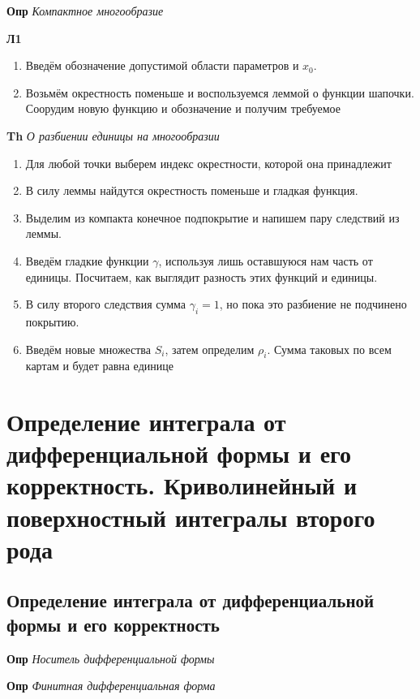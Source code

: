 \documentclass[a4paper, 14pt]{article}
\begin{document}
    \textbf{Опр} \textit{Компактное многообразие}
    
    \textbf{Л1}
    
    \begin{enumerate}
        \item Введём обозначение допустимой области параметров и $x_0$.
        \item Возьмём окрестность поменьше и воспользуемся леммой о функции шапочки.
        Соорудим новую функцию и обозначение и получим требуемое
    \end{enumerate}
    
    \textbf{Th} \textit{О разбиении единицы на многообразии}
    
    \begin{enumerate}
        \item Для любой точки выберем индекс окрестности, которой она принадлежит
        \item В силу леммы найдутся окрестность поменьше и гладкая функция.
        \item Выделим из компакта конечное подпокрытие и напишем пару следствий из леммы.
        \item Введём гладкие функции $\gamma$, используя лишь оставшуюся нам часть от единицы.
        Посчитаем, как выглядит разность этих функций и единицы.
        \item В силу второго следствия сумма $\gamma_i = 1$, но пока это разбиение не подчинено покрытию.
        \item Введём новые множества $S_i$, затем определим $\rho_i$.
        Сумма таковых по всем картам и будет равна единице
    \end{enumerate}
    
    \section{Определение интеграла от дифференциальной формы и его корректность.
    Криволинейный и поверхностный интегралы второго рода}
    
    \subsection{Определение интеграла от дифференциальной формы и его корректность}
    
    \textbf{Опр} \textit{Носитель дифференциальной формы}
    
    \textbf{Опр} \textit{Финитная дифференциальная форма}
    
\end{document}
